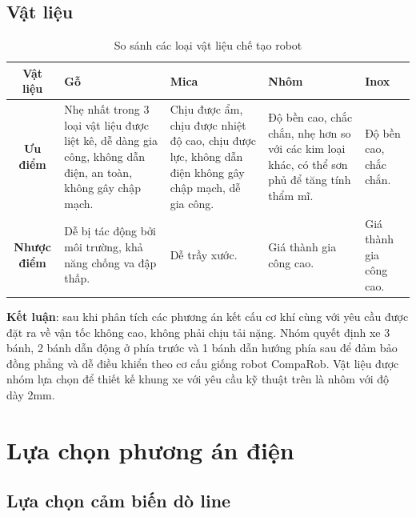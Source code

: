         \subsection{Vật liệu}
            \begin{table}[H]
                \centering
                \caption{So sánh các loại vật liệu chế tạo robot}
                \begin{tabular}{|c|p{2.8cm}|p{2.8cm}|p{2.8cm}|p{2.8cm}|}
                    \hline
                    \textbf{Vật liệu} & \textbf{Gỗ} & \textbf{Mica} & \textbf{Nhôm} & \textbf{Inox} \\
                    \hline
                    \textbf{Ưu điểm} 
                    & Nhẹ nhất trong 3 loại vật liệu được liệt kê, dễ dàng gia công, không dẫn điện, an toàn, không gây chập mạch.  
                    & Chịu được ẩm, chịu được nhiệt độ cao, chịu được lực, không dẫn điện không gây chập mạch, dễ gia công.
                    & Độ bền cao, chắc chắn, nhẹ hơn so với các kim loại khác, có thể sơn phủ để tăng tính thẩm mĩ.
                    & Độ bền cao, chắc chắn. \\
                    \hline
                    \textbf{Nhược điểm} 
                    & Dễ bị tác động bởi môi trường, khả năng chống va đập thấp.
                    & Dễ trầy xước.
                    & Giá thành gia công cao.
                    & Giá thành gia công cao. \\
                    \hline
                \end{tabular} 
                \label{tab:label}
            \end{table}
        \hspace*{0.6cm}\textbf{Kết luận}: sau khi phân tích các phương án kết cấu cơ khí cùng với yêu cầu được đặt ra về vận tốc không cao, không phải chịu tải nặng. Nhóm quyết định xe 3 bánh, 2 bánh dẫn động ở phía trước và 1 bánh dẫn hướng phía sau để đảm bảo đồng phẳng và dễ điều khiển theo cơ cấu giống robot CompaRob. Vật liệu được nhóm lựa chọn để thiết kế khung xe với yêu cầu kỹ thuật trên là nhôm với độ dày 2mm. 
    \section{Lựa chọn phương án điện}
        \subsection{Lựa chọn cảm biến dò line}
